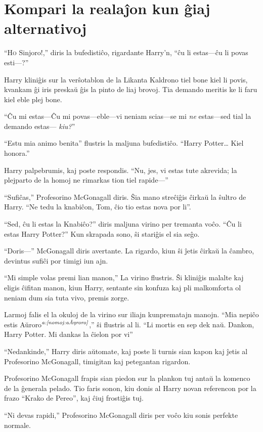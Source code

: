 \chapter{Kompari la realaĵon kun ĝiaj alternativoj}

``\lettrine{H}o Sinjoro!,'' diris la bufedistiĉo, rigardante Harry'n, ``ĉu li
estas—ĉu li povas esti—?''

Harry kliniĝis sur la verŝotablon de la Likanta Kaldrono tiel bone
kiel li povis, kvankam ĝi iris preskaŭ ĝis la pinto de liaj
brovoj. Tia demando meritis ke li faru kiel eble plej bone.

``Ĉu mi estas—Ĉu mi povas—eble—vi neniam scias—se mi \emph{ne} estas—sed
tial la demando estas— \emph{kiu?}''

``Estu mia animo benita'' flustris la maljuna bufedistiĉo. ``Harry
Potter\ldots{} Kiel honora.''

Harry palpebrumis, kaj poste respondis. ``Nu, jes, vi estas tute akrevida; la
plejparto de la homoj ne rimarkas tion tiel rapide—''

``Sufiĉas,'' Profesorino McGonagall diris. Ŝia mano streĉiĝis ĉirkaŭ
la ŝultro de Harry. ``Ne tedu la knabiĉon, Tom, ĉio tio estas nova por
li''.

``Sed, ĉu li estas la Knabiĉo?'' diris maljuna virino per tremanta
voĉo. ``Ĉu li estas Harry Potter?'' Kun skrapada sono, ŝi stariĝis el
sia seĝo.

``Doris—'' McGonagall diris avertante. La rigardo, kiun ŝi ĵetis
ĉirkaŭ la ĉambro, devintus sufiĉi por timigi iun ajn.

``Mi simple volas premi lian manon,'' La virino flustris. Ŝi kliniĝis
malalte kaj eligis ĉifitan manon, kiun Harry, sentante sin konfuza kaj
pli malkomforta ol neniam dum sia tuta vivo, premis zorge.

Larmoj falis el la okuloj de la virino sur iliajn kunprematajn
manojn. ``Mia nepiĉo estis Aŭroro$^{\textit{a:\ref{nomoj:aŭroro}}}$,'' ŝi
flustris al li. ``Li mortis en sep dek naŭ. Dankon, Harry Potter. Mi
dankas la ĉielon por vi''

``Nedankinde,'' Harry diris aŭtomate, kaj poste li turnis sian kapon
kaj ĵetis al Profesorino McGonagall, timigitan kaj petegantan rigardon.

Profesorino McGonagall frapis sian piedon sur la plankon tuj antaŭ la
komenco de la ĝenerala pelado. Tio faris sonon, kiu donis al Harry
novan referencon por la frazo ``Krako de Pereo'', kaj ĉiuj frostiĝis
tuj.

``Ni devas rapidi,'' Profesorino McGonagall diris per voĉo kiu sonis
perfekte normale.

